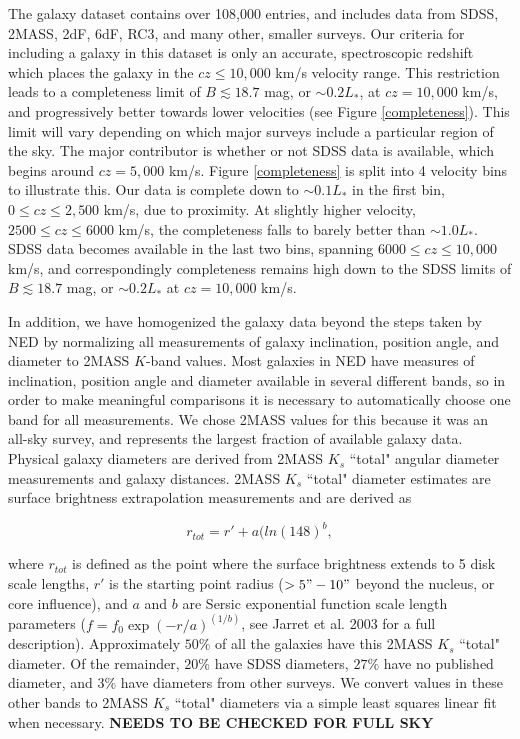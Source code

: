 \documentclass[iop]{emulateapj-rtx4}
\begin{document}
The galaxy dataset contains over 108,000 entries, and includes data from SDSS, 2MASS, 2dF, 6dF, RC3, and many other, smaller surveys. Our criteria for including a galaxy in this dataset is only an accurate, spectroscopic redshift which places the galaxy in the $cz \leq 10,000$ km/s velocity range. This restriction leads to a completeness limit of $B \lesssim 18.7$ mag, or $\sim0.2 L_*$, at $cz = 10,000$ km/s, and progressively better towards lower velocities (see Figure \ref{completeness}). This limit will vary depending on which major surveys include a particular region of the sky. The major contributor is whether or not SDSS data is available, which begins around $cz = 5,000$ km/s. Figure \ref{completeness} is split into 4 velocity bins to illustrate this. Our data is complete down to $\sim0.1 L_*$ in the first bin, $0 \leq cz \leq 2,500$ km/s, due to proximity. At slightly higher velocity, $2500 \leq cz \leq 6000$ km/s, the completeness falls to barely better than $\sim1.0 L_*$. SDSS data becomes available in the last two bins, spanning $6000 \leq cz \leq 10,000$ km/s, and correspondingly completeness remains high down to the SDSS limits of $B \lesssim 18.7$ mag, or $\sim0.2 L_*$ at $cz = 10,000$ km/s.


In addition, we have homogenized the galaxy data beyond the steps taken by NED by normalizing all measurements of galaxy inclination, position angle, and diameter to 2MASS $K$-band values. Most galaxies in NED have measures of inclination, position angle and diameter available in several different bands, so in order to make meaningful comparisons it is necessary to automatically choose one band for all measurements. We chose 2MASS values for this because it was an all-sky survey, and represents the largest fraction of available galaxy data. Physical galaxy diameters are derived from 2MASS $K_s$ ``total" angular diameter measurements and galaxy distances. 2MASS $K_s$ ``total" diameter estimates are surface brightness extrapolation measurements and are derived as 

\begin{equation}
r_{tot} = r' + a(ln(148)^b,
\end{equation}

\noindent where $r_{tot}$ is defined as the point where the surface brightness extends to 5 disk scale lengths, $r'$ is the starting point radius ($>5" - 10"$ beyond the nucleus, or core influence), and $a$ and $b$ are Sersic exponential function scale length parameters ($f = f_0 \exp{(-r/a)}^{(1/b)}$, see Jarret et al. 2003 for a full description). Approximately $50\%$ of all the galaxies have this 2MASS $K_s$ ``total" diameter. Of the remainder, $20\%$ have SDSS diameters, $27\%$ have no published diameter, and $3\%$ have diameters from other surveys. We convert values in these other bands to 2MASS $K_s$ ``total" diameters via a simple least squares linear fit when necessary. \textbf{NEEDS TO BE CHECKED FOR FULL SKY}
\end{document}
